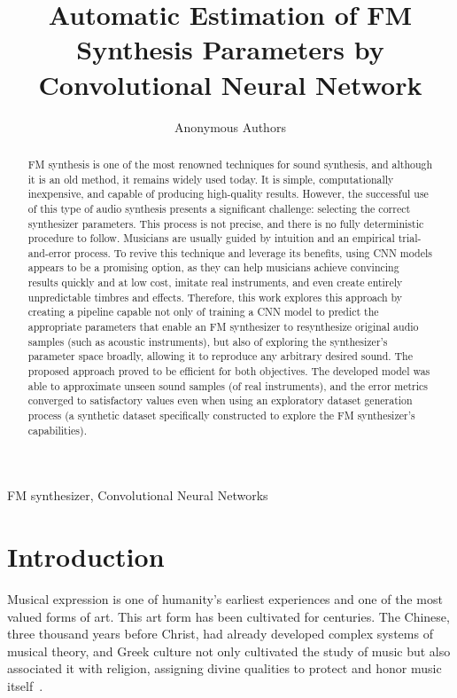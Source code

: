 \documentclass[10pt,conference]{IEEEtran}
\title{\LARGE \bf
Automatic Estimation of FM Synthesis Parameters by Convolutional Neural Network
}
\begin{document}
\author{Anonymous Authors}

\maketitle
\thispagestyle{empty}
\pagestyle{empty}


\begin{abstract}
FM synthesis is one of the most renowned techniques for sound synthesis, and although it is an old method, it remains widely used today. It is simple, computationally inexpensive, and capable of producing high-quality results. However, the successful use of this type of audio synthesis presents a significant challenge: selecting the correct synthesizer parameters. This process is not precise, and there is no fully deterministic procedure to follow. Musicians are usually guided by intuition and an empirical trial-and-error process. To revive this technique and leverage its benefits, using CNN models appears to be a promising option, as they can help musicians achieve convincing results quickly and at low cost, imitate real instruments, and even create entirely unpredictable timbres and effects. Therefore, this work explores this approach by creating a pipeline capable not only of training a CNN model to predict the appropriate parameters that enable an FM synthesizer to resynthesize original audio samples (such as acoustic instruments), but also of exploring the synthesizer’s parameter space broadly, allowing it to reproduce any arbitrary desired sound. The proposed approach proved to be efficient for both objectives. The developed model was able to approximate unseen sound samples (of real instruments), and the error metrics converged to satisfactory values even when using an exploratory dataset generation process (a synthetic dataset specifically constructed to explore the FM synthesizer’s capabilities).
\end{abstract}

\begin{IEEEkeywords}
FM synthesizer, Convolutional Neural Networks
\end{IEEEkeywords}

\section{Introduction}

Musical expression is one of humanity’s earliest experiences and one of the most valued forms of art. This art form has been cultivated for centuries. The Chinese, three thousand years before Christ, had already developed complex systems of musical theory, and Greek culture not only cultivated the study of music but also associated it with religion, assigning divine qualities to protect and honor music itself~\cite{med1996teoria}.
\end{document}
